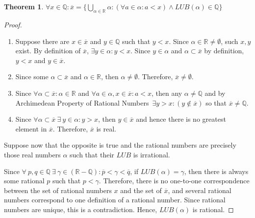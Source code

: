 \documentclass[12pt]{article}
\def\Re{\mathbb{R}}
\def\Q{\mathbb{Q}}
\def\arc{Archimedean Property of Rational Numbers}
\def\v{\\ \vspace{0.1in}}
\def\x{\overline{x}}
\def\ss{\subset}
\def\es{\emptyset}
\newtheorem{theorem}{Theorem}[section]
\theoremstyle{definition}
\theoremstyle{remark}
\begin{document}
\section{}

\begin{theorem}
  $\forall x \in \Q: \x=\{\bigcup\limits_{\alpha\in\Re} \alpha: (\forall a\in\alpha:a<x) \wedge
  LUB(\alpha)\in\Q\}$
\end{theorem}
\begin{proof}
\begin{enumerate}
\item Suppose there are $x \in \x$ and $y\in\Q$ such that $y<x$. Since
  $\alpha\in\Re \neq \es$, such $x,y$ exist. By definition of $\x$,
  $\exists y \in\alpha:y<x$. Since $y\in\alpha$ and $\alpha \ss \x$ by
  definition, $y<x$ and $y\in\x$.
\item Since some $\alpha\ss\x$ and $\alpha\in\Re$, then
  $\alpha\neq\es$. Therefore, $\x\neq\es$.
\item Since $\forall \alpha\ss\x: \alpha \in \Re$ and
  $\forall a \in \alpha, x\in\x:a<x$, then any
  $\alpha\neq\Q$ and by \arc\ $\exists y > x:( y\not\in \x)$ so that $\x\neq\Q$.
\item Since $\forall \alpha \ss\x\ \exists\ y\in\alpha: y>x$, then
  $y\in\x$ and hence there is no greatest element in $\x$. Therefore, $\x$ is real.
\end{enumerate}

Suppose now that the opposite is true and the rational numbers are
precisely those real numbers $\alpha$ such that their $LUB$ is irrational.\v

Since
$\forall\ p,q \in \Q\ \exists\ \gamma \in (\Re-\Q):
\overline{p}<\gamma<\overline{q}$, if $LUB(\alpha)=\gamma$, then there
is always some rational $p$ such that $p<\gamma$. Therefore, there is
no one-to-one correspondence between the set of rational numbers $x$
and the set of $\x$, and several rational numbers correspond to one
definition of a rational number. Since rational numbers are unique, this is a
contradiction. Hence, $LUB(\alpha)$ is rational.
\end{proof}


\section{}
\end{document}
